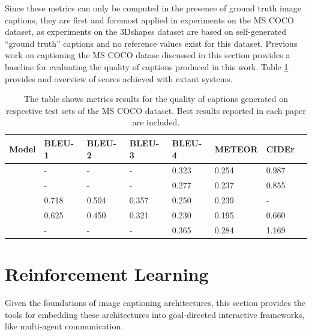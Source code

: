 Since these metrics can only be computed in the presence of ground truth image captions, they are first and foremost applied in experiments on the MS COCO dataset, as experiments on the 3Dshapes dataset are based on self-generated ``ground truth'' captions and no reference values exist for this dataset.
Previous work on captioning the MS COCO datase discussed in this section provides a baseline for evaluating the quality of captions produced in this work. Table \ref{tab_coco_metrics_ref} provides and overview of scores achieved with extant systems.

\begin{table}[]
	\begin{tabularx}{\textwidth}{|X|l|l|l|l|l|l|l|}
		\hline
		Model                               & BLEU-1 & BLEU-2 & BLEU-3 & BLEU-4 & METEOR & CIDEr \\ \hline
		\cite{bengio2015scheduled}        & -      & -      & -      & 0.323   & 0.254  & 0.987 \\ \hline
		\cite{vinyals2015show}  & -      & -      & -      & 0.277    & 0.237  & 0.855 \\ \hline
		\cite{xu2015show} & 0.718  & 0.504  & 0.357  & 0.250     & 0.239  & -     \\ \hline
		\cite{karpathy2015deep}          & 0.625  & 0.450  & 0.321  & 0.230   & 0.195  & 0.660 \\ \hline
		\cite{zhou2019unified}          & -  & -  & -  & 0.365   & 0.284  & 1.169 \pt{?} \\ \hline
	\end{tabularx}
\caption{\label{tab_coco_metrics_ref}The table shows metrics results for the quality of captions generated on respective test sets of the MS COCO dataset. Best results reported in each paper are included.}
\end{table}

\section{Reinforcement Learning}
\label{rl}

Given the foundations of image captioning architectures, this section provides the tools for embedding these architectures into goal-directed interactive frameworks, like multi-agent communication.

